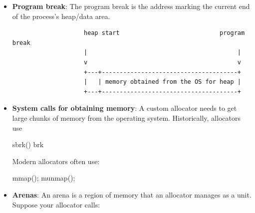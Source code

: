 \documentclass{report}
\begin{document}
\begin{itemize}
\begin{verbatim}
                    |                      |      initialized to zero
                    +----------------------+
                    | heap                 | malloc/free usually 
                    |                      | manage this region
                    | grows upward         |
                    +----------------------+
                    | ... unused gap ...   |
                    +----------------------+
                    | stack                |
                    | grows downward       |
                    +----------------------+
                    high addresses
                \end{verbatim}
                The heap begins after the program’s data segment, historically after the uninitialized data segment, also called BSS.
            \item \textbf{Program break}: The program break is the address marking the current end of the process’s heap/data area.
                \begin{verbatim}
                    heap start                            program break
                    |                                          |
                    v                                          v
                    +---+--------------------------------------+
                    |   | memory obtained from the OS for heap |
                    +---+--------------------------------------+
                \end{verbatim}
            \item \textbf{System calls for obtaining memory}: A custom allocator needs to get large chunks of memory from the operating system. 
                \bigbreak \noindent 
                Historically, allocators use
                \bigbreak \noindent 
                \begin{cppcode}
                sbrk()
                brk
                \end{cppcode}
                \bigbreak \noindent 
                Modern allocators often use:
                \bigbreak \noindent 
                \begin{cppcode}
                mmap();
                munmap();
                \end{cppcode}
            \item \textbf{Arenas}: An arena is a region of memory that an allocator manages as a unit.
                \bigbreak \noindent 
                Suppose your allocator calls:
                \bigbreak \noindent 
                \begin{cppcode}

\end{cppcode}
\end{itemize}
\end{document}
